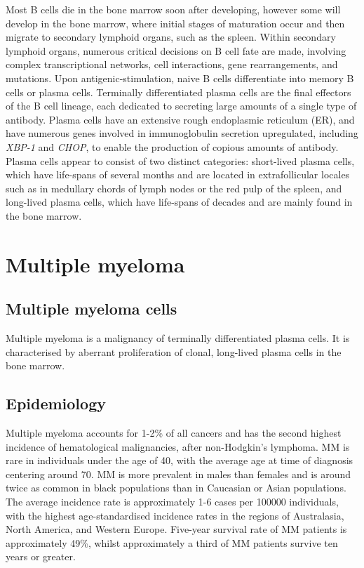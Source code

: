 Most B cells die in the bone marrow soon after developing, however some will develop in the bone marrow, where initial stages of maturation occur and then migrate to secondary lymphoid organs, such as the spleen.
Within secondary lymphoid organs, numerous critical decisions on B cell fate are made, involving complex transcriptional networks, cell interactions, gene rearrangements, and mutations\cite{roth2014tracking, jourdan2011characterization}.
Upon antigenic-stimulation, naive B cells differentiate into memory B cells or plasma cells.
Terminally differentiated plasma cells are the final effectors of the B cell lineage, each dedicated to secreting large amounts of a single type of antibody.
Plasma cells have an extensive rough endoplasmic reticulum (ER), and have numerous genes involved in immunoglobulin secretion upregulated, including \textit{XBP-1} and \textit{CHOP}\cite{shapiro2004plasma}, to enable the production of copious amounts of antibody.
Plasma cells appear to consist of two distinct categories: short-lived plasma cells, which have life-spans of several months and are located in extrafollicular locales such as in medullary chords of lymph nodes or the red pulp of the spleen, and long-lived plasma cells, which have life-spans of decades and are mainly found in the bone marrow\cite{bortnick2013and, andraud2012living}.



\section{Multiple myeloma}
\subsection{Multiple myeloma cells}
Multiple myeloma is a malignancy of terminally differentiated plasma cells.
It is characterised by aberrant proliferation of clonal, long-lived plasma cells in the bone marrow\cite{anderson2011pathogenesis}.

\subsection{Epidemiology}
Multiple myeloma accounts for 1-2\% of all cancers and has the second highest incidence of hematological malignancies, after non-Hodgkin's lymphoma\cite{international2003criteria}.
MM is rare in individuals under the age of 40, with the average age at time of diagnosis centering around 70\cite{tsang2019multiple, palumbo2011multiple}.
MM is more prevalent in males than females and is around twice as common in black populations than in Caucasian or Asian populations\cite{nhsmyeloma}.
The average incidence rate is approximately 1-6 cases per 100000 individuals\cite{tsang2019multiple, palumbo2011multiple, teras20162016}, with the highest age-standardised incidence rates in the regions of Australasia, North America, and Western Europe\cite{cowan2018global}.
Five-year survival rate of MM patients is approximately 49\%, whilst approximately a third of MM patients survive ten years or greater\cite{cancerresearchuk, siegel2016cancer}.

